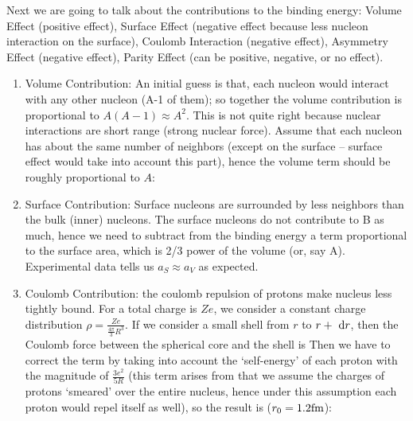 \documentclass{school-22.101-notes}
\date{November 14, 2011}
\begin{document}
\maketitle

Next we are going to talk about the contributions to the binding energy: Volume Effect (positive effect), Surface Effect (negative effect because less nucleon interaction on the surface), Coulomb Interaction (negative effect), Asymmetry Effect (negative effect), Parity Effect (can be positive, negative, or no effect). 
\begin{enumerate}
    \item Volume Contribution: An initial guess is that, each nucleon would interact with any other nucleon (A-1 of them); so together the volume contribution is proportional to $A(A-1) \approx A^2$. This is not quite right because nuclear interactions are short range (strong nuclear force). Assume that each nucleon has about the same number of neighbors (except on the surface -- surface effect would take into account this part), hence the volume term should be roughly proportional to $A$:

    \item Surface Contribution: Surface nucleons are surrounded by less neighbors than the bulk (inner) nucleons. The surface nucleons do not contribute to B as much, hence we need to subtract from the binding energy a term proportional to the surface area, which is 2/3 power of the volume (or, say A). Experimental data tells us $a_S \approx a_V$ as expected. 

    \item Coulomb Contribution: the coulomb repulsion of protons make nucleus less tightly bound. For a total charge is $Ze$, we consider a constant charge distribution $\rho = \frac{Ze}{\frac{4\pi}{3} R^3}.$ If we consider a small shell from $r$ to $r + \mbox{ }\mathrm{d} r$, then the Coulomb force between the spherical core and the shell is 
    Then we have to correct the term by taking into account the `self-energy' of each proton with the magnitude of $\frac{3e^2}{5R}$ (this term arises from that we assume the charges of protons `smeared' over the entire nucleus, hence under this assumption each proton would repel itself as well), so the result is ($r_0 = 1.2 \mathrm{fm}$):


\end{enumerate}
\end{document}
